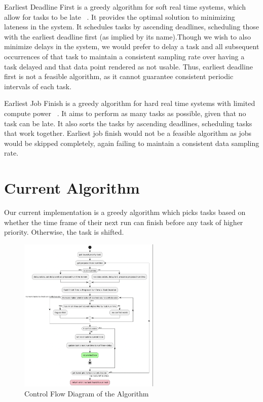\documentclass{article}
\begin{document}
Earliest Deadline First is a greedy algorithm for soft real time systems, which allow for tasks to be late ~\cite{Karger97}. It provides the optimal solution to minimizing lateness in the system. It schedules tasks by ascending deadlines, scheduling those with the earliest deadline first (as implied by its name).Though we wish to also minimize delays in the system, we would prefer to delay a task and all subsequent occurrences of that task to maintain a consistent sampling rate over having a task delayed and that data point rendered as not usable. Thus, earliest deadline first is not a feasible algorithm, as it cannot guarantee consistent periodic intervals of each task. \newline

Earliest Job Finish is a greedy algorithm for hard real time systems with limited compute power ~\cite{Karger97}. It aims to perform as many tasks as possible, given that no task can be late. It also sorts the tasks by ascending deadlines, scheduling tasks that work together. Earliest job finish would not be a feasible algorithm as jobs would be skipped completely, again failing to maintain a consistent data sampling rate.  

\section{Current Algorithm}

Our current implementation is a greedy algorithm which picks tasks based on whether the time frame of their next run can finish before any task of higher priority. Otherwise, the task is shifted. 

\begin{figure}[h]
    \centering
    \includegraphics[width=0.6\textwidth]{control_flow.png}
    \caption{Control Flow Diagram of the Algorithm}
    \label{fig:example}
\end{figure}
\end{document}

